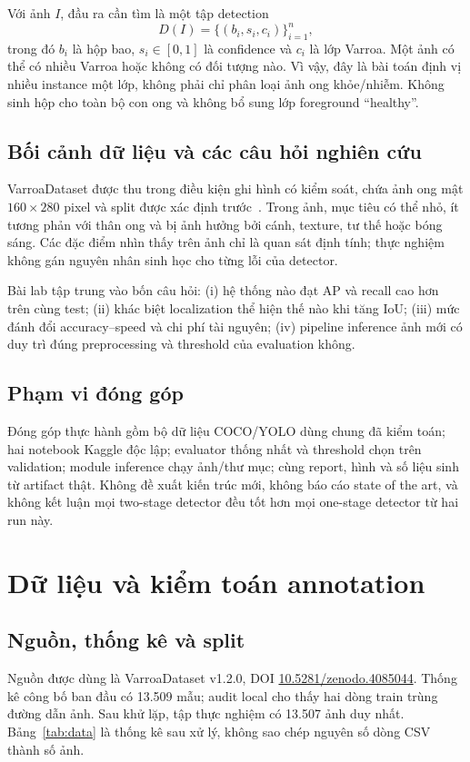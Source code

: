 \documentclass[a4paper,10pt,twocolumn]{article}
\begin{document}
Với ảnh $I$, đầu ra cần tìm là một tập detection
\begin{equation}
 D(I)=\{(b_i,s_i,c_i)\}_{i=1}^{n},
\end{equation}
trong đó $b_i$ là hộp bao, $s_i\in[0,1]$ là confidence và $c_i$ là lớp Varroa.
Một ảnh có thể có nhiều Varroa hoặc không có đối tượng nào. Vì vậy, đây là bài toán
định vị nhiều instance một lớp, không phải chỉ phân loại ảnh ong khỏe/nhiễm.
Không sinh hộp cho toàn bộ con ong và không bổ sung lớp foreground ``healthy''.

\subsection{Bối cảnh dữ liệu và các câu hỏi nghiên cứu}
VarroaDataset được thu trong điều kiện ghi hình có kiểm soát, chứa ảnh ong mật
$160\times280$ pixel và split được xác định trước~\cite{varroa,datasetrepo}.
Trong ảnh, mục tiêu có thể nhỏ, ít tương phản với thân ong và bị ảnh hưởng bởi cánh,
texture, tư thế hoặc bóng sáng. Các đặc điểm nhìn thấy trên ảnh chỉ là quan sát
định tính; thực nghiệm không gán nguyên nhân sinh học cho từng lỗi của detector.

Bài lab tập trung vào bốn câu hỏi: (i) hệ thống nào đạt AP và recall cao hơn trên
cùng test; (ii) khác biệt localization thể hiện thế nào khi tăng IoU; (iii) mức đánh đổi
accuracy--speed và chi phí tài nguyên; (iv) pipeline inference ảnh mới có duy trì
đúng preprocessing và threshold của evaluation không.

\subsection{Phạm vi đóng góp}
Đóng góp thực hành gồm bộ dữ liệu COCO/YOLO dùng chung đã kiểm toán; hai notebook
Kaggle độc lập; evaluator thống nhất và threshold chọn trên validation; module inference
chạy ảnh/thư mục; cùng report, hình và số liệu sinh từ artifact thật.
Không đề xuất kiến trúc mới, không báo cáo state of the art, và không kết luận mọi
two-stage detector đều tốt hơn mọi one-stage detector từ hai run này.

\section{Dữ liệu và kiểm toán annotation}
\subsection{Nguồn, thống kê và split}
Nguồn được dùng là VarroaDataset v1.2.0, DOI
\href{https://doi.org/10.5281/zenodo.4085044}{10.5281/zenodo.4085044}.
Thống kê công bố ban đầu có 13.509 mẫu; audit local cho thấy hai dòng train trùng
đường dẫn ảnh. Sau khử lặp, tập thực nghiệm có 13.507 ảnh duy nhất.
Bảng~\ref{tab:data} là thống kê sau xử lý, không sao chép nguyên số dòng CSV thành số ảnh.
\end{document}
